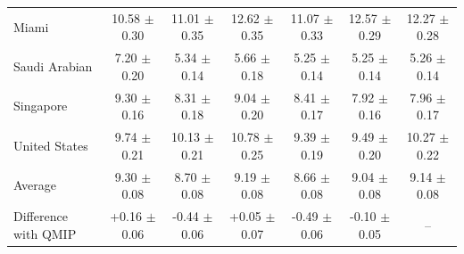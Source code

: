 \begin{tabular}{lcccccc}
Miami & 10.58 $\pm$ 0.30 & 11.01 $\pm$ 0.35 & 12.62 $\pm$ 0.35 & 11.07 $\pm$ 0.33 & 12.57 $\pm$ 0.29 & 12.27 $\pm$ 0.28 \\
Saudi Arabian & 7.20 $\pm$ 0.20 & 5.34 $\pm$ 0.14 & 5.66 $\pm$ 0.18 & 5.25 $\pm$ 0.14 & 5.25 $\pm$ 0.14 & 5.26 $\pm$ 0.14 \\
Singapore & 9.30 $\pm$ 0.16 & 8.31 $\pm$ 0.18 & 9.04 $\pm$ 0.20 & 8.41 $\pm$ 0.17 & 7.92 $\pm$ 0.16 & 7.96 $\pm$ 0.17 \\
United States & 9.74 $\pm$ 0.21 & 10.13 $\pm$ 0.21 & 10.78 $\pm$ 0.25 & 9.39 $\pm$ 0.19 & 9.49 $\pm$ 0.20 & 10.27 $\pm$ 0.22 \\
\midrule
Average & 9.30 $\pm$ 0.08 & 8.70 $\pm$ 0.08 & 9.19 $\pm$ 0.08 & 8.66 $\pm$ 0.08 & 9.04 $\pm$ 0.08 & 9.14 $\pm$ 0.08 \\
Difference with QMIP & +0.16 $\pm$ 0.06 & -0.44 $\pm$ 0.06 & +0.05 $\pm$ 0.07 & -0.49 $\pm$ 0.06 & -0.10 $\pm$ 0.05 & -- \\
\bottomrule
\end{tabular}

